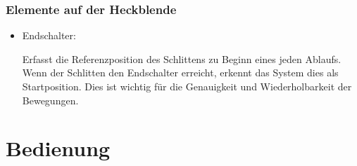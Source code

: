 \documentclass[a4paper,12pt]{report}
\begin{document}
	\subsection{Elemente auf der Heckblende}
	\begin{itemize}[leftmargin=1.5em]
		
		\item Endschalter:
		
		Erfasst die Referenzposition des Schlittens zu Beginn eines jeden Ablaufs. Wenn der Schlitten den Endschalter erreicht, erkennt das System dies als Startposition. Dies ist wichtig für die Genauigkeit und Wiederholbarkeit der Bewegungen.\\
		
	\end{itemize}
	
	
	\chapter{Bedienung}
\end{document}
